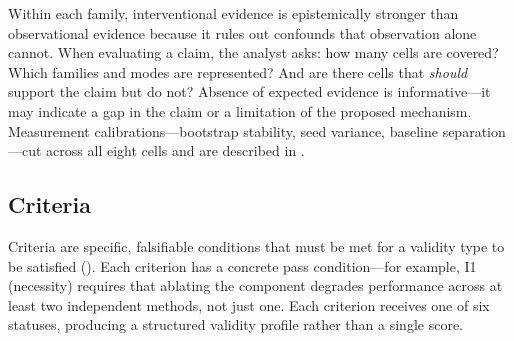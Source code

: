 \documentclass{article}
\begin{document}
Within each family, interventional evidence is epistemically stronger than observational evidence because it rules out confounds that observation alone cannot. When evaluating a claim, the analyst asks: how many cells are covered? Which families and modes are represented? And are there cells that \emph{should} support the claim but do not? Absence of expected evidence is informative---it may indicate a gap in the claim or a limitation of the proposed mechanism. Measurement calibrations---bootstrap stability, seed variance, baseline separation---cut across all eight cells and are described in .

\subsection{Criteria}
\label{sec:criteria}

Criteria are specific, falsifiable conditions that must be met for a validity type to be satisfied (). Each criterion has a concrete pass condition---for example, I1 (necessity) requires that ablating the component degrades performance across at least two independent methods, not just one. Each criterion receives one of six statuses, producing a structured validity profile rather than a single score.
\end{document}

